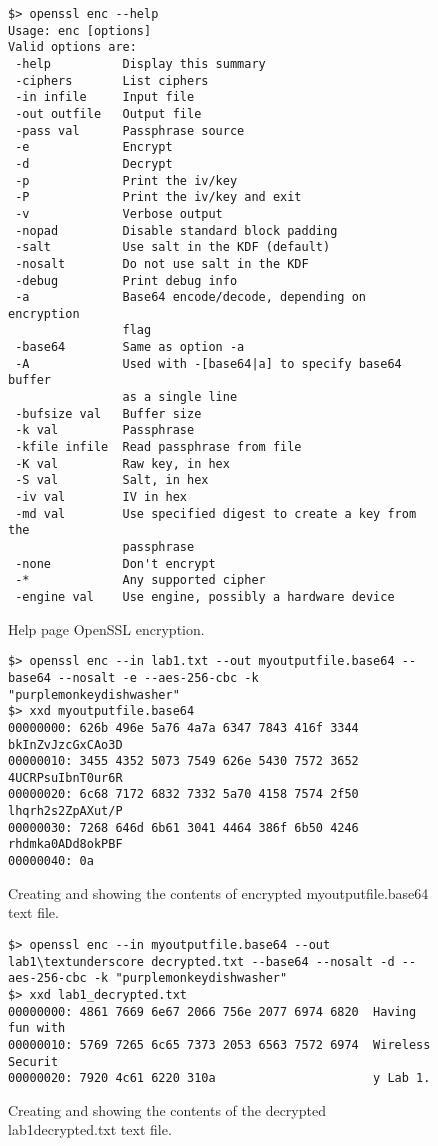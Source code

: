 \documentclass{article}
\begin{document}
\begin{figure}
\begin{mdframed}
\begin{lstlisting}
$> openssl enc --help
Usage: enc [options]
Valid options are:
 -help          Display this summary
 -ciphers       List ciphers
 -in infile     Input file
 -out outfile   Output file
 -pass val      Passphrase source
 -e             Encrypt
 -d             Decrypt
 -p             Print the iv/key
 -P             Print the iv/key and exit
 -v             Verbose output
 -nopad         Disable standard block padding
 -salt          Use salt in the KDF (default)
 -nosalt        Do not use salt in the KDF
 -debug         Print debug info
 -a             Base64 encode/decode, depending on encryption
                flag
 -base64        Same as option -a
 -A             Used with -[base64|a] to specify base64 buffer
                as a single line
 -bufsize val   Buffer size
 -k val         Passphrase
 -kfile infile  Read passphrase from file
 -K val         Raw key, in hex
 -S val         Salt, in hex
 -iv val        IV in hex
 -md val        Use specified digest to create a key from the
                passphrase
 -none          Don't encrypt
 -*             Any supported cipher
 -engine val    Use engine, possibly a hardware device
\end{lstlisting}
\end{mdframed}
\caption{Help page OpenSSL encryption.}
\label{fig:step1c}
\end{figure}

\begin{figure}
\begin{mdframed}
\begin{lstlisting}
$> openssl enc --in lab1.txt --out myoutputfile.base64 --base64 --nosalt -e --aes-256-cbc -k "purplemonkeydishwasher"
$> xxd myoutputfile.base64
00000000: 626b 496e 5a76 4a7a 6347 7843 416f 3344  bkInZvJzcGxCAo3D
00000010: 3455 4352 5073 7549 626e 5430 7572 3652  4UCRPsuIbnT0ur6R
00000020: 6c68 7172 6832 7332 5a70 4158 7574 2f50  lhqrh2s2ZpAXut/P
00000030: 7268 646d 6b61 3041 4464 386f 6b50 4246  rhdmka0ADd8okPBF
00000040: 0a
\end{lstlisting}
\end{mdframed}
\caption{Creating and showing the contents of encrypted myoutputfile.base64 text file.}
\label{fig:step1d}
\end{figure}

\begin{figure}
\begin{mdframed}
\begin{lstlisting}
$> openssl enc --in myoutputfile.base64 --out lab1\textunderscore decrypted.txt --base64 --nosalt -d --aes-256-cbc -k "purplemonkeydishwasher"
$> xxd lab1_decrypted.txt
00000000: 4861 7669 6e67 2066 756e 2077 6974 6820  Having fun with 
00000010: 5769 7265 6c65 7373 2053 6563 7572 6974  Wireless Securit
00000020: 7920 4c61 6220 310a                      y Lab 1.
\end{lstlisting}
\end{mdframed}
\caption{Creating and showing the contents of the decrypted lab1\textunderscore decrypted.txt text file.}
\label{fig:step1e}
\end{figure}
\end{document}
